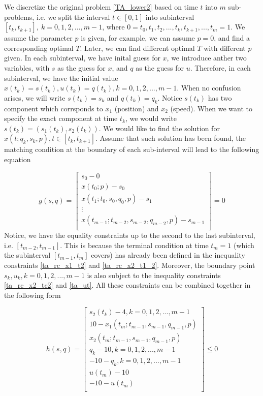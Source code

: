 	We discretize the original problem \ref{TA_lower2} based on time $t$ into $m$ sub-problems, i.e. we split the interval $t\in [0,1]$ into subinterval $[t_{k}, t_{k+1}],\  k = 0, 1, 2, ..., m-1$, where $0 = t_0, t_1, t_2, ...,t_k, t_{k+1}, ..., t_m = 1$. We assume the parameter $p$ is given, for example, we can assume $p=0$, and find a corresponding optimal $T$. Later, we can find different optimal $T$ with different $p$ given. In each subinterval, we have inital guess for $x$, we introduce anther two variables, with $s$ as the guess for $x$, and $q$ as the guess for $u$. Therefore, in each subinterval, we have the initial value $ x(t_k) = s(t_k), u(t_k) = q(t_k),  k = 0, 1, 2, ..., m-1$. When no confusion arises, we will write $s(t_k) = s_k $ and $q(t_k) = q_k$. Notice $s(t_k)$ has two component which corrsponds to $x_1$ (position) and $x_2$ (speed). When we want to specify the exact component at time $t_k$, we would write $s(t_k) = (s_1(t_k), s_2(t_k))$. We would like to find the solution for $x(t; q_k, s_k, p),  t  \in [t_{k}, t_{k+1}]$. Assume that such solution has been found, the matching condition at the boundary of each sub-interval will lead to the following equation
	
	\begin{equation}
		g(s,q) = \begin{bmatrix}
			s_0 -0 \\
			x(t_0; p) - s_0  \\
			x(t_1; t_0, s_0, q_0, p) - s_1 \\ 
			\vdots \\
			x(t_{m-1}; t_{m-2}, s_{m-2}, q_{m-2}, p) - s_{m-1} \\
		\end{bmatrix} = 0
		\label{TA_eqCons}
	\end{equation}
	Notice, we have the equality constraints up to the second to the last subinterval, i.e. $[t_{m-2}, t_{m-1}]$. This is because the terminal condition at time $t_m =1$ (which the subinterval $[t_{m-1}, t_m]$ covers) has already been defined in the inequality constraints \ref{ta_rc_x1_t2} and \ref{ta_rc_x2_t1_2}. Moreover, the boundary point $s_k, u_k, k = 0, 1, 2, ..., m-1$ is also subject to the inequality constraints \ref{ta_rc_x2_tc2} and \ref{ta_ut}. All these constraints can be combined together in the following form
	
	\begin{equation}
		h(s,q) = \begin{bmatrix}
			s_2(t_k) - 4, k =0, 1, 2, ..., m-1  \\
			10 - x_1(t_m; t_{m-1}, s_{m-1}, q_{m-1}, p)\\ 
			x_2(t_m; t_{m-1}, s_{m-1}, q_{m-1}, p) \\
			q_k - 10,   k =0, 1, 2, ..., m-1 \\
			-10 - q_k,  k =0, 1, 2, ..., m-1 \\
			u(t_m) - 10 \\
			-10 - u(t_m) \\
		\end{bmatrix} \leq 0
		\label{TA_IneqCons}
	\end{equation}
	

